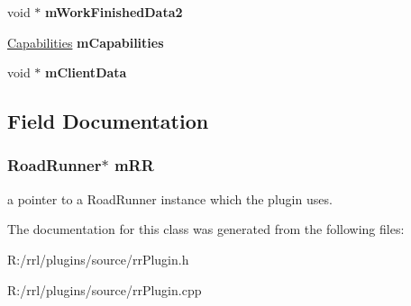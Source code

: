 \begin{DoxyCompactItemize}
\item 
\hypertarget{classrrp_1_1_plugin_aa97ee1143a6b3b573087422d7617e0f0}{void $\ast$ {\bfseries m\-Work\-Finished\-Data2}}\label{classrrp_1_1_plugin_aa97ee1143a6b3b573087422d7617e0f0}

\item 
\hypertarget{classrrp_1_1_plugin_a9e12ea3cbeefbfc2cc64a50f5e61ace8}{\hyperlink{classrrp_1_1_capabilities}{Capabilities} {\bfseries m\-Capabilities}}\label{classrrp_1_1_plugin_a9e12ea3cbeefbfc2cc64a50f5e61ace8}

\item 
\hypertarget{classrrp_1_1_plugin_a711b972dfc233045debc311a5aa006c1}{void $\ast$ {\bfseries m\-Client\-Data}}\label{classrrp_1_1_plugin_a711b972dfc233045debc311a5aa006c1}

\end{DoxyCompactItemize}


\subsection{Field Documentation}
\hypertarget{classrrp_1_1_plugin_a7d9856795c612466d534acc1c499d99d}{
\subsubsection[{m\-R\-R}]{\setlength{\rightskip}{0pt plus 5cm}Road\-Runner$\ast$ m\-R\-R\hspace{0.3cm}{\ttfamily [protected]}}}\label{classrrp_1_1_plugin_a7d9856795c612466d534acc1c499d99d}
a pointer to a Road\-Runner instance which the plugin uses. 

The documentation for this class was generated from the following files\-:\begin{DoxyCompactItemize}
\item 
R\-:/rrl/plugins/source/rr\-Plugin.\-h\item 
R\-:/rrl/plugins/source/rr\-Plugin.\-cpp\end{DoxyCompactItemize}

